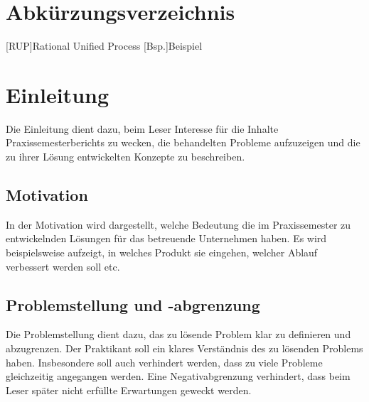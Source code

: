 \documentclass[oneside]{ausarbeitung}
\begin{document}
\listoffigures

\listoftables

\chapter*{Abkürzungsverzeichnis}
\begin{acronym}[Bsp.]  %

[RUP]{Rational Unified Process}
[Bsp.]{Beispiel}
\end{acronym}
\cleardoublepage
{}
\setcounter{page}{1}

\chapter{Einleitung}
\label{cha:einleitung}

Die Einleitung dient dazu, beim Leser Interesse für die Inhalte 
Praxissemesterberichts zu wecken, die behandelten Probleme aufzuzeigen 
und die zu ihrer Lösung entwickelten Konzepte zu beschreiben.

\section{Motivation}
\label{sec:motivation}

In der Motivation wird dargestellt, welche Bedeutung die im 
Praxissemester zu entwickelnden Lösungen für das betreuende Unternehmen 
haben. Es wird beispielsweise aufzeigt, in welches Produkt sie eingehen, 
welcher Ablauf verbessert werden soll etc.

\section{Problemstellung und -abgrenzung}
\label{sec:problemstellung}

Die Problemstellung dient dazu, das zu lösende Problem klar zu 
definieren und abzugrenzen. Der Praktikant soll ein klares Verständnis 
des zu lösenden Problems haben. Insbesondere soll auch verhindert 
werden, dass zu viele Probleme gleichzeitig angegangen werden. Eine 
Negativabgrenzung verhindert, dass beim Leser später nicht erfüllte 
Erwartungen geweckt werden.
\end{document}
